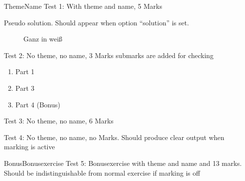 \documentclass[pdftex,quiz,formula]{newcsen}
\begin{document}
\begin{exercise}{5}{Theme}{Name}
  Test 1: With theme and name, 5 Marks
  \begin{solution}
    Pseudo solution. Should appear when option ``solution'' is set.
  \end{solution}
\end{exercise}

\begin{figure}[ht]
  \centering
  \vspace*{3cm}
  \caption{Ganz in weiß}
  \label{fig:test}
\end{figure}

\begin{exercise}{3}{}{}
  Test 2: No theme, no name, 3 Marks submarks are added for checking
  \begin{enumerate}
  \item Part 1 
  \item Part 3 
  \item Part 4 (Bonus) 
  \end{enumerate}
\end{exercise}

\begin{exercise}{6}{}{}
  Test 3: No theme, no name, 6 Marks
\end{exercise}

\begin{exercise}{}{}{}
  Test 4: No theme, no name, no Marks. Should produce clear output
  when marking is active
\end{exercise}

\begin{bonusexercise}{13}{Bonus}{Bonusexercise}
  Test 5: Bonusexercise with theme and name and 13 marks. Should be
  indistinguishable from normal exercise if marking is off
\end{bonusexercise}
\end{document}
